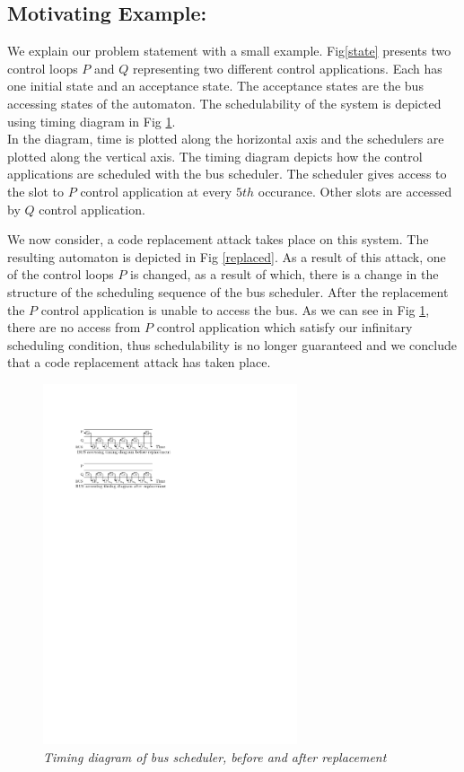 \subsection{Motivating Example:}
\noindent
We explain our problem statement with a small example. Fig\ref{state} presents two control loops $P$ and $Q$  representing two different control applications.
Each has one initial state and an acceptance state. The acceptance states are the bus accessing states
of the automaton. The  schedulability of the system is depicted using timing diagram in Fig \ref{state-transition}. \\

\noindent
In the diagram, time is plotted along the horizontal axis and the schedulers are plotted along the vertical axis. The timing diagram depicts how the control
applications are scheduled with the bus scheduler. The scheduler gives access to the slot to $P$ control application at every $5th$ occurance. Other slots 
are accessed by $Q$ control application. 


\noindent
We now consider, a code replacement attack takes place on this system. The resulting automaton is depicted in Fig \ref{replaced}.
As a result of this attack, one of the control loops $P$ is changed, as a result of which, there is a change in the structure of the scheduling sequence of the bus scheduler. 
After the replacement the $P$ control application is unable to access the bus.  As we can see in Fig \ref{state-transition},
there are no access from $P$ control application which satisfy our infinitary scheduling condition,
thus schedulability is no longer guaranteed and we conclude that a code replacement attack has taken place.

\begin{figure}
\begin{center}
\includegraphics[width= 75mm]{bus_timing_diagram.pdf}
\end{center}
\caption{{\em Timing diagram of bus scheduler, before and after replacement}}
\label{state-transition}
\end{figure}

